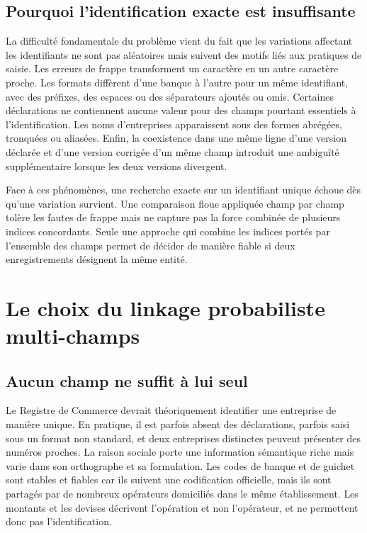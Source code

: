 \subsection{Pourquoi l'identification exacte est insuffisante}

La difficulté fondamentale du problème vient du fait que les variations affectant les identifiants ne sont pas aléatoires mais suivent des motifs liés aux pratiques de saisie. Les erreurs de frappe transforment un caractère en un autre caractère proche. Les formats diffèrent d'une banque à l'autre pour un même identifiant, avec des préfixes, des espaces ou des séparateurs ajoutés ou omis. Certaines déclarations ne contiennent aucune valeur pour des champs pourtant essentiels à l'identification. Les noms d'entreprises apparaissent sous des formes abrégées, tronquées ou aliasées. Enfin, la coexistence dans une même ligne d'une version déclarée et d'une version corrigée d'un même champ introduit une ambiguïté supplémentaire lorsque les deux versions divergent.

Face à ces phénomènes, une recherche exacte sur un identifiant unique échoue dès qu'une variation survient. Une comparaison floue appliquée champ par champ tolère les fautes de frappe mais ne capture pas la force combinée de plusieurs indices concordants. Seule une approche qui combine les indices portés par l'ensemble des champs permet de décider de manière fiable si deux enregistrements désignent la même entité.

\section{Le choix du linkage probabiliste multi-champs}

\subsection{Aucun champ ne suffit à lui seul}

Le Registre de Commerce devrait théoriquement identifier une entreprise de manière unique. En pratique, il est parfois absent des déclarations, parfois saisi sous un format non standard, et deux entreprises distinctes peuvent présenter des numéros proches. La raison sociale porte une information sémantique riche mais varie dans son orthographe et sa formulation. Les codes de banque et de guichet sont stables et fiables car ils suivent une codification officielle, mais ils sont partagés par de nombreux opérateurs domiciliés dans le même établissement. Les montants et les devises décrivent l'opération et non l'opérateur, et ne permettent donc pas l'identification.

